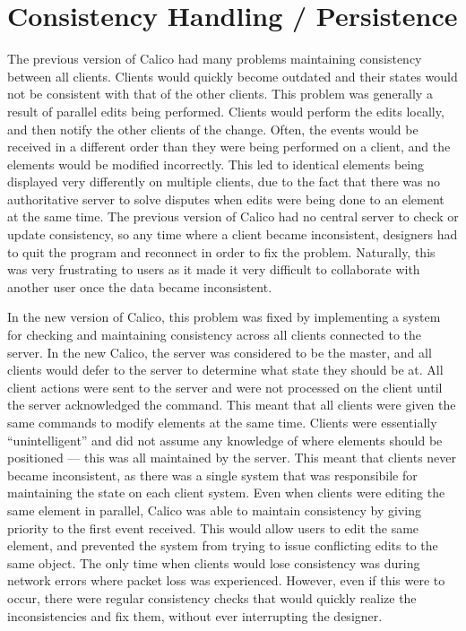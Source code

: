 
\section{Consistency Handling / Persistence}
The previous version of Calico had many problems maintaining consistency between all clients. Clients would quickly become outdated and their states would not be consistent with that of the other clients. 
This problem was generally a result of parallel edits being performed. Clients would perform the edits locally, and then notify the other clients of the change. Often, the events would be received in a different order than they were being performed on a client, and the elements would be modified incorrectly. This led to identical elements being displayed very differently on multiple clients, due to the fact that there was no authoritative server to solve disputes when edits were being done to an element at the same time.
The previous version of Calico had no central server to check or update consistency, so any time where a client became inconsistent, designers had to quit the program and reconnect in order to fix the problem.
Naturally, this was very frustrating to users as it made it very difficult to collaborate with another user once the data became inconsistent. 

In the new version of Calico, this problem was fixed by implementing a system for checking and maintaining consistency across all clients connected to the server. In the new Calico, the server was considered to be the master, and all clients would defer to the server to determine what state they should be at. All client actions were sent to the server and were not processed on the client until the server acknowledged the command. This meant that all clients were given the same commands to modify elements at the same time. Clients were essentially ``unintelligent'' and did not assume any knowledge of where elements should be positioned --- this was all maintained by the server. This meant that clients never became inconsistent, as there was a single system that was responsibile for maintaining the state on each client system. 
Even when clients were editing the same element in parallel, Calico was able to maintain consistency by giving priority to the first event received. This would allow users to edit the same element, and prevented the system from trying to issue conflicting edits to the same object.
The only time when clients would lose consistency was during network errors where packet loss was experienced. However, even if this were to occur, there were regular consistency checks that would quickly realize the inconsistencies and fix them, without ever interrupting the designer.

